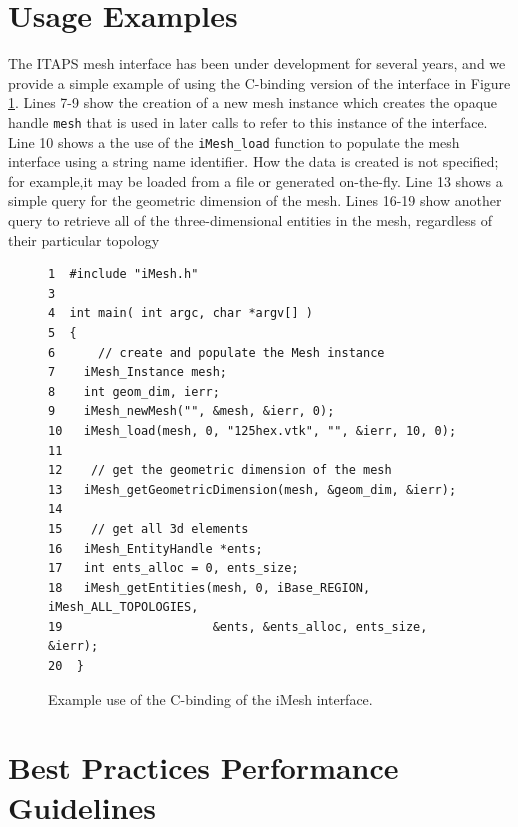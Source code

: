 \documentclass{article}
\begin{document}
\section{Usage Examples}
The ITAPS mesh interface has been under development for several years,
and we provide a simple example of using the C-binding version of the
interface in Figure \ref{fig:imesh}. Lines 7-9 show the creation of a
new mesh instance which creates the opaque handle {\tt mesh} that is
used in later calls to refer to this instance of the interface.  Line
10 shows a the use of the {\tt iMesh\_load} function to populate the
mesh interface using a string name identifier.  How the data is
created is not specified; for example,it may be loaded from a file or
generated on-the-fly.  Line 13 shows a simple query for the geometric
dimension of the mesh.  Lines 16-19 show another query to
retrieve all of the three-dimensional entities in the mesh, regardless
of their particular topology

\begin{figure}
\begin{verbatim}
1  #include "iMesh.h"
3
4  int main( int argc, char *argv[] )
5  {
6      // create and populate the Mesh instance
7    iMesh_Instance mesh;
8    int geom_dim, ierr;
9    iMesh_newMesh("", &mesh, &ierr, 0);
10   iMesh_load(mesh, 0, "125hex.vtk", "", &ierr, 10, 0);
11
12    // get the geometric dimension of the mesh
13   iMesh_getGeometricDimension(mesh, &geom_dim, &ierr);
14
15    // get all 3d elements
16   iMesh_EntityHandle *ents;
17   int ents_alloc = 0, ents_size;
18   iMesh_getEntities(mesh, 0, iBase_REGION, iMesh_ALL_TOPOLOGIES,
19                     &ents, &ents_alloc, ents_size, &ierr);
20  }
\end{verbatim}
\caption{Example use of the C-binding of the iMesh interface.}\label{fig:imesh}
\end{figure}

\section{Best Practices Performance Guidelines}
\end{document}
